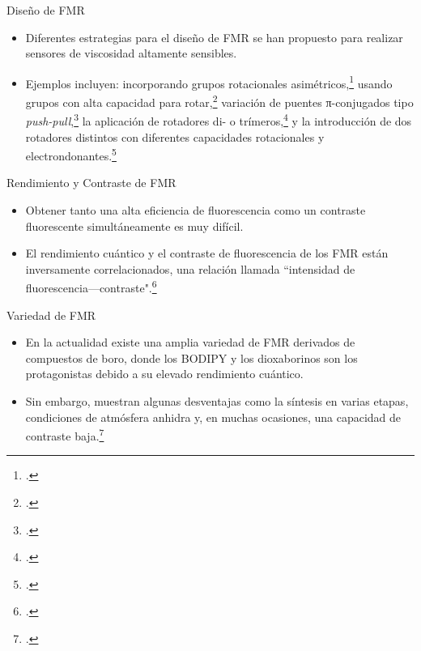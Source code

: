 \documentclass[%
spanish,
mexico]{beamer}
\begin{document}
\begin{frame}{Diseño de FMR}
    \begin{itemize}[<+- | alert@+>]
        \item Diferentes estrategias para el diseño de \gls{FMR} se han propuesto para realizar sensores de viscosidad altamente sensibles.
        \item Ejemplos incluyen: incorporando grupos rotacionales asimétricos,\footcite{leePyrrolicMolecularRotors2016} usando grupos con alta capacidad para rotar,\footcite{karpenkoPushPullDioxaborine2016} variación de puentes π-conjugados tipo \emph{push-pull},\footcite{karpenkoPushPullDioxaborine2016} la aplicación de rotadores di- o trímeros,\footcite{kimballBODIPYBODIPYDyad2015} y la introducción de dos rotadores distintos con diferentes capacidades rotacionales y electrondonantes.\footcite{rautTriazinebasedBODIPYTrimer2016}
    \end{itemize}
\end{frame}

\begin{frame}{Rendimiento y Contraste de FMR}
    \begin{itemize}[<+- | alert@+>]
        \item Obtener tanto una alta eficiencia de fluorescencia como un contraste fluorescente simultáneamente es muy difícil.
        \item El rendimiento cuántico y el contraste de fluorescencia de los \gls{FMR} están inversamente correlacionados, una relación llamada ``intensidad de fluorescencia---contraste".\footcite{leeFrontCoverFluorescent2018}
    \end{itemize}
\end{frame}

\begin{frame}{Variedad de FMR}
    \begin{itemize}
        \item En la actualidad existe una amplia variedad de \gls{FMR} derivados de compuestos de boro, donde los \gls{BODIPY} y los dioxaborinos son los protagonistas debido a su elevado rendimiento cuántico.
        \item Sin embargo, muestran algunas desventajas como la síntesis en varias etapas, condiciones de atmósfera anhidra y, en muchas ocasiones, una capacidad de contraste baja.\footcite{karpenkoPushPullDioxaborine2016,guptaBodipyBasedFluorescent2016,liBODIPYBasedTwoPhotonFluorescent2018,kimBorondifluorideComplexesHemicurcuminoids2016}
    \end{itemize}
\end{frame}
\end{document}
